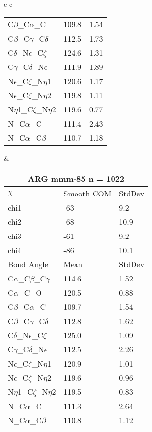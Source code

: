 \begin{longtable}{ c c }
\begin{tabular}{ l l l }
  C$\beta$\_C$\alpha$\_C & 109.8 & 1.54\\
  C$\beta$\_C$\gamma$\_C$\delta$ & 112.5 & 1.73\\
  C$\delta$\_N$\epsilon$\_C$\zeta$ & 124.6 & 1.31\\
  C$\gamma$\_C$\delta$\_N$\epsilon$ & 111.9 & 1.89\\
  N$\epsilon$\_C$\zeta$\_N$\eta$1 & 120.6 & 1.17\\
  N$\epsilon$\_C$\zeta$\_N$\eta$2 & 119.8 & 1.11\\
  N$\eta$1\_C$\zeta$\_N$\eta$2 & 119.6 & 0.77\\
  N\_C$\alpha$\_C & 111.4 & 2.43\\
  N\_C$\alpha$\_C$\beta$ & 110.7 & 1.18\\
  \bottomrule
  \end{tabular}
  &
  \begin{tabular}{ l l l }
  \toprule
  \multicolumn{3}{c}{ARG \textbf{mmm-85} n = 1022} \\ \toprule
  $\chi$       & Smooth COM & StdDev \\ \midrule
  chi1 & -63 & 9.2 \\ 
  chi2 & -68 & 10.9 \\ 
  chi3 & -61 & 9.2 \\ 
  chi4 & -86 & 10.1 \\ \midrule
  Bond Angle   & Mean     & StdDev \\ \midrule
  C$\alpha$\_C$\beta$\_C$\gamma$ & 114.6 & 1.52\\
  C$\alpha$\_C\_O & 120.5 & 0.88\\
  C$\beta$\_C$\alpha$\_C & 109.7 & 1.54\\
  C$\beta$\_C$\gamma$\_C$\delta$ & 112.8 & 1.62\\
  C$\delta$\_N$\epsilon$\_C$\zeta$ & 125.0 & 1.09\\
  C$\gamma$\_C$\delta$\_N$\epsilon$ & 112.5 & 2.26\\
  N$\epsilon$\_C$\zeta$\_N$\eta$1 & 120.9 & 1.01\\
  N$\epsilon$\_C$\zeta$\_N$\eta$2 & 119.6 & 0.96\\
  N$\eta$1\_C$\zeta$\_N$\eta$2 & 119.5 & 0.83\\
  N\_C$\alpha$\_C & 111.3 & 2.64\\
  N\_C$\alpha$\_C$\beta$ & 110.8 & 1.12\\
  \bottomrule
  \end{tabular}
  \\
  
\end{longtable}

